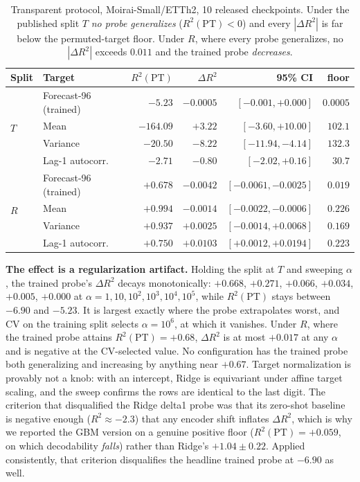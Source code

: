 \documentclass{article}
\begin{document}
\begin{table}[h]
\centering
\caption{Transparent protocol, Moirai-Small/ETTh2, 10 released checkpoints. Under the published
split $T$ \emph{no probe generalizes} ($R^2(\text{PT}){<}0$) and every $|\Delta R^2|$ is far
below the permuted-target floor. Under $R$, where every probe generalizes, no $|\Delta R^2|$
exceeds $0.011$ and the trained probe \emph{decreases}.}
\label{tab:transparent}
\small
\begin{tabular}{@{}llrrr r@{}}
\toprule
Split & Target & $R^2(\text{PT})$ & $\Delta R^2$ & 95\% CI & floor \\
\midrule
\multirow{4}{*}{$T$}
 & Forecast-96 (trained) & $-5.23$   & $-0.0005$ & $[-0.001, +0.000]$ & $0.0005$ \\
 & Mean                  & $-164.09$ & $+3.22$   & $[-3.60, +10.00]$  & $102.1$ \\
 & Variance              & $-20.50$  & $-8.22$   & $[-11.94, -4.14]$  & $132.3$ \\
 & Lag-1 autocorr.       & $-2.71$   & $-0.80$   & $[-2.02, +0.16]$   & $30.7$ \\
\midrule
\multirow{4}{*}{$R$}
 & Forecast-96 (trained) & $+0.678$ & $-0.0042$ & $[-0.0061, -0.0025]$ & $0.019$ \\
 & Mean                  & $+0.994$ & $-0.0014$ & $[-0.0022, -0.0006]$ & $0.226$ \\
 & Variance              & $+0.937$ & $+0.0025$ & $[-0.0014, +0.0068]$ & $0.169$ \\
 & Lag-1 autocorr.       & $+0.750$ & $+0.0103$ & $[+0.0012, +0.0194]$ & $0.223$ \\
\bottomrule
\end{tabular}
\end{table}

\textbf{The effect is a regularization artifact.} Holding the split at $T$ and sweeping $\alpha$, the
trained probe's $\Delta R^2$ decays monotonically: $+0.668$, $+0.271$, $+0.066$, $+0.034$, $+0.005$,
$+0.000$ at $\alpha = 1, 10, 10^2, 10^3, 10^4, 10^5$, while $R^2(\text{PT})$ stays between $-6.90$
and $-5.23$. It is largest exactly where the probe extrapolates worst, and CV on the training split
selects $\alpha{=}10^6$, at which it vanishes. Under $R$, where the trained probe attains
$R^2(\text{PT}){=}+0.68$, $\Delta R^2$ is at most $+0.017$ at any $\alpha$ and is negative at the
CV-selected value. No configuration has the trained probe both generalizing and increasing by
anything near $+0.67$. Target normalization is provably not a knob: with an intercept, Ridge is
equivariant under affine target scaling, and the sweep confirms the rows are identical to the last
digit. The criterion that disqualified the Ridge delta1 probe was that its zero-shot
baseline is negative enough ($R^2 \approx -2.3$) that any encoder shift inflates $\Delta R^2$, which
is why we reported the GBM version on a genuine positive floor ($R^2(\text{PT}){=}{+}0.059$, on which
decodability \emph{falls}) rather than Ridge's $+1.04{\pm}0.22$. Applied consistently, that criterion
disqualifies the headline trained probe at $-6.90$ as well.
\end{document}
